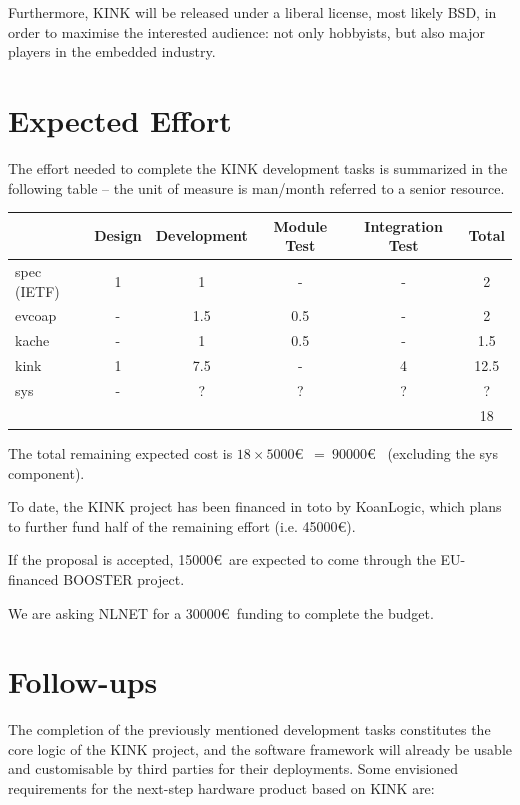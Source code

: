 \documentclass[12pt]{article}
\begin{document}
Furthermore, KINK will be released under a liberal license, most likely BSD, in order to maximise the interested audience: not only hobbyists, but also major players in the embedded industry.

\section{Expected Effort}
The effort needed to complete the KINK development tasks is summarized in the following table -- the unit of measure is man/month referred to a senior resource.

\begin{center}
\begin{tabular}{|l|c|c|c|c|c|}
	\hline 
	  & Design & Development & Module Test & Integration Test & Total \\
	\hline
	spec (IETF) & 1     & 1     & -     & -     & 2 \\
	\hline 
	evcoap      & -     & 1.5   & 0.5   & -     & 2 \\
	\hline
	kache       & -     & 1     & 0.5   & -     & 1.5 \\
	\hline
	kink        & 1     & 7.5   & -     & 4     & 12.5 \\
	\hline
	sys         & -     & ?     & ?     & ?     & ? \footnotemark \\
	\hline
	\multicolumn{5}{|c|}{} & 18 \\
	\hline
\end{tabular}
\end{center}

The total remaining expected cost is $18 \times 5000$\euro~$=~90000$\euro~ (excluding the sys component).

To date, the KINK project has been financed in toto by KoanLogic, which plans to further fund half of the remaining effort (i.e. 45000\euro).

If the proposal is accepted, 15000\euro~are expected to come through the EU-financed BOOSTER project.

We are asking NLNET for a 30000\euro~funding to complete the budget.

\section{Follow-ups}

The completion of the previously mentioned development tasks constitutes the core logic of the KINK project, and the software framework will already be usable and customisable by third parties for their deployments. Some envisioned requirements for the next-step hardware product based on KINK are:
\end{document}
